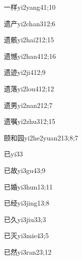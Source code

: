 \begin{verbete}{一样}{yi2yang4}{1;10}
\end{verbete}
\begin{verbete}{遗产}{yi2chan3}{12;6}
\end{verbete}
\begin{verbete}{遗骸}{yi2hai2}{12;15}
\end{verbete}
\begin{verbete}{遗憾}{yi2han4}{12;16}
\end{verbete}
\begin{verbete}{遗迹}{yi2ji4}{12;9}
\end{verbete}
\begin{verbete}{遗落}{yi2lou4}{12;12}
\end{verbete}
\begin{verbete}{遗男}{yi2nan2}{12;7}
\end{verbete}
\begin{verbete}{遗嘱}{yi2zhu3}{12;15}
\end{verbete}
\begin{verbete}{颐和园}{yi2he2yuan2}{13;8;7}
\end{verbete}
\begin{verbete}{已}{yi3}{3}
\end{verbete}
\begin{verbete}{已故}{yi3gu4}{3;9}
\end{verbete}
\begin{verbete}{已婚}{yi3hun1}{3;11}
\end{verbete}
\begin{verbete}{已经}{yi3jing1}{3;8}
\end{verbete}
\begin{verbete}{已久}{yi3jiu3}{3;3}
\end{verbete}
\begin{verbete}{已灭}{yi3mie4}{3;5}
\end{verbete}
\begin{verbete}{已然}{yi3ran2}{3;12}
\end{verbete}
